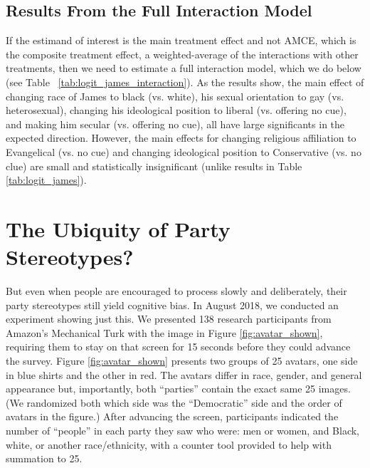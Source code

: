\documentclass[12pt, letterpaper]{article}
\begin{document}
\subsection{Results From the Full Interaction Model}
If the estimand of interest is the main treatment effect and not AMCE, which is the composite treatment effect, a weighted-average of the interactions with other treatments, then we need to estimate a full interaction model, which we do below (see Table ~\ref{tab:logit_james_interaction}). As the results show, the main effect of changing race of James to black (vs. white), his sexual orientation to gay (vs. heterosexual), changing his ideological position to liberal (vs. offering no cue), and making him secular (vs. offering no cue), all have large significants in the expected direction. However, the main effects for changing religious affiliation to Evangelical (vs. no cue) and changing ideological position to Conservative (vs. no clue) are small and statistically insignificant (unlike results in Table \ref{tab:logit_james}).



\section{The Ubiquity of Party Stereotypes?}

But even when people are encouraged to process slowly and deliberately, their party stereotypes still yield cognitive bias. In August 2018, we conducted an experiment showing just this. We presented 138 research participants from Amazon's Mechanical Turk with the image in Figure \ref{fig:avatar_shown}, requiring them to stay on that screen for 15 seconds before they could advance the survey. Figure \ref{fig:avatar_shown} presents two groups of 25 avatars, one side in blue shirts and the other in red. The avatars differ in race, gender, and general appearance but, importantly, both ``parties'' contain the exact same 25 images. (We randomized both which side was the ``Democratic'' side and the order of avatars in the figure.) After advancing the screen, participants indicated the number of ``people'' in each party they saw who were: men or women, and Black, white, or another race/ethnicity, with a counter tool provided to help with summation to 25. 
\end{document}
